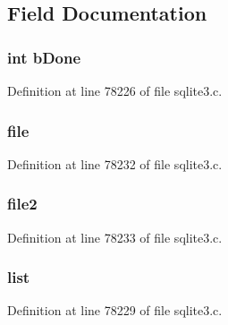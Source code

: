 \subsection{Field Documentation}
\hypertarget{struct_sort_subtask_a2bdd020d727ee274453933c1fc07317b}{}
\subsubsection[{b\+Done}]{\setlength{\rightskip}{0pt plus 5cm}int b\+Done}\label{struct_sort_subtask_a2bdd020d727ee274453933c1fc07317b}


Definition at line 78226 of file sqlite3.\+c.

\hypertarget{struct_sort_subtask_ae256a788a6c676ec0d1caa2ad8d57b73}{}
\subsubsection[{file}]{ file}\label{struct_sort_subtask_ae256a788a6c676ec0d1caa2ad8d57b73}


Definition at line 78232 of file sqlite3.\+c.

\hypertarget{struct_sort_subtask_a4f1ec1d2d2073a19bdc2110325a6a070}{}
\subsubsection[{file2}]{ file2}\label{struct_sort_subtask_a4f1ec1d2d2073a19bdc2110325a6a070}


Definition at line 78233 of file sqlite3.\+c.

\hypertarget{struct_sort_subtask_a0b728adf85f50e92f631147bac5f46ac}{}
\subsubsection[{list}]{ list}\label{struct_sort_subtask_a0b728adf85f50e92f631147bac5f46ac}


Definition at line 78229 of file sqlite3.\+c.

